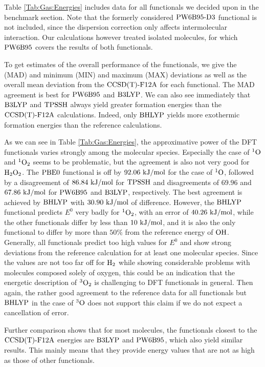 \documentclass[8.5pt,twoside,twocolumn]{article}
\newcommand\singo{\enmat{{^1\te{O}}}}
\newcommand\tripo{\enmat{{^3\te{O}}}}
\newcommand\singot{\enmat{{^1\ot}}}
\newcommand\tripot{\enmat{{^3\ot}}}
\newcommand\kmo{\enmat{\te {kJ/mol}}}
\theoremstyle{standard}
\begin{document}
Table \ref{Tab:Gas:Energies} includes data for all functionals we decided upon
in the benchmark section. Note that the formerly considered $\text{PW6B95}\text{-D3}$ functional
is not included, since the dispersion correction only affects intermolecular
interaction. Our calculations however treated isolated molecules, for which
$\text{PW6B95}$ covers the results of both functionals.

To get estimates of the overall performance of the functionals,
we give the  (MAD) and minimum (MIN)
and maximum (MAX) deviations as well as the overall mean deviation
from the $\text{CCSD(T)-F12A}$ for each functional. The MAD agreement is
best for $\text{PW6B95}$ and $\text{B3LYP}$. We can also see immediately
that $\text{B3LYP}$ and $\text{TPSSH}$ always yield greater formation energies
than the $\text{CCSD(T)-F12A}$ calculations. Indeed, only $\text{BHLYP}$ yields 
more exothermic formation energies than the reference calculations.

As we can see in Table \ref{Tab:Gas:Energies}, the approximative power
of the DFT functionals varies strongly among the molecular species.
Especially the case of $\singo$ and $\singot$ seems to be problematic, but
the agreement is also not very good for $\text H _2 \text O_2$. The $\text{PBE0}$ functional
is off by $92.06~\kmo$ for the case of $\singo$, followed
by a disagreement of $86.84~\kmo$ for $\text{TPSSH}$ and disagreements
of $69.96$ and $67.86~\kmo$ for $\text{PW6B95}$ and $\text{B3LYP}$, respectively.
The best agreement is achieved by $\text{BHLYP}$ with $30.90~\kmo$ of
difference. However, the $\text{BHLYP}$ functional predicts 
$E^0$ very badly for $\singot$, with an error of $40.26~\kmo$,
while the other functionals differ by less than $10~\kmo$, and it is also
the only functional to differ by more than $50\%$ from the reference energy
of $\text O \text H$. Generally, all functionals predict too high values for $E^0$
and show strong deviations from the reference calculation for at least one
molecular species.
Since the values are not too far off for $\text H_2$ while showing
considerable problems with molecules composed solely of oxygen,
this could be an indication that the energetic description of $\tripot$
is challenging to DFT functionals in general. Then again, the rather good
agreement to the reference data for all functionals but $\text{BHLYP}$ in the case
of $\tripo$ does not support this claim if we do not expect
a cancellation of error. 

Further comparison shows that for most molecules, the functionals
closest to the $\text{CCSD(T)-F12A}$ energies are $\text{B3LYP}$ and $\text{PW6B95}$, which
also yield similar results. This mainly means that they provide
energy values that are not as high as those of other functionals. 
\end{document}
